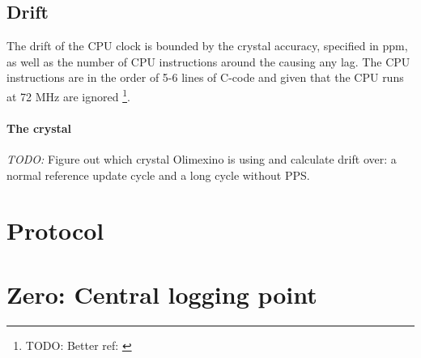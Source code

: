 \documentclass[a4paper]{article}
\begin{document}
\begin{multicols}{2}
  \subsection{Drift}
  The drift of the CPU clock is bounded by the crystal accuracy,
  specified in ppm, as well as the number of CPU instructions around the
  causing any lag. The CPU instructions are in the order of 5-6 lines of
  C-code and given that the CPU runs at 72 MHz are ignored
  \footnote{TODO: Better ref: \cite{stm32f103rbt6_ds}}.

  \paragraph{The crystal} \textit{TODO:} Figure out which crystal Olimexino is
  using and calculate drift over: a normal reference update cycle and a
  long cycle without PPS.

  \section{Protocol}

  \section{Zero: Central logging point}


\vspace{5em}
\printbibliography
\end{multicols}
\end{document}
